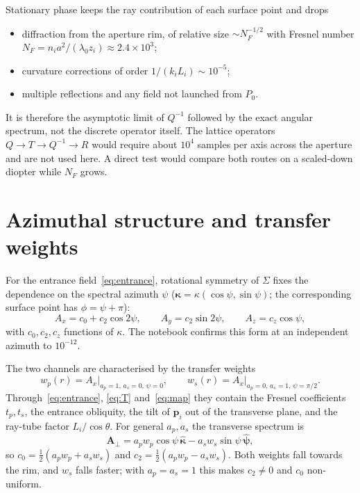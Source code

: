 \documentclass[11pt,a4paper]{article}
\newcommand{\ve}[1]{\bm{#1}}
\begin{document}
Stationary phase keeps the ray contribution of each surface point and drops
\begin{itemize}
 \item diffraction from the aperture rim, of relative size
 $\sim N_F^{-1/2}$ with Fresnel number
 $N_F=n_i a^2/(\lambda_0 z_i)\approx 2.4\times10^3$;
 \item curvature corrections of order $1/(k_iL_i)\sim10^{-5}$;
 \item multiple reflections and any field not launched from $P_0$.
\end{itemize}
It is therefore the asymptotic limit of $Q^{-1}$ followed by the exact angular
spectrum, not the discrete operator itself. The lattice operators
$Q\to T\to Q^{-1}\to R$ would require about $10^4$ samples per axis across the
aperture and are not used here. A direct test would compare both routes on a
scaled-down diopter while $N_F$ grows.

\section{Azimuthal structure and transfer weights}

For the entrance field~\eqref{eq:entrance}, rotational symmetry of $\Sigma$ fixes
the dependence on the spectral azimuth $\psi$
($\boldsymbol\kappa=\kappa(\cos\psi,\sin\psi)$; the corresponding surface point
has $\phi=\psi+\pi$):
\begin{equation}
 A_x=c_0+c_2\cos2\psi,\qquad A_y=c_2\sin2\psi,\qquad A_z=c_z\cos\psi ,
 \label{eq:azimuth}
\end{equation}
with $c_0,c_2,c_z$ functions of $\kappa$. The notebook confirms this form at an
independent azimuth to $10^{-12}$.

The two channels are characterised by the transfer weights
\begin{equation}
 w_p(r)=A_x\big|_{a_p=1,\,a_s=0,\,\psi=0},\qquad
 w_s(r)=A_x\big|_{a_p=0,\,a_s=1,\,\psi=\pi/2}.
\end{equation}
Through~\eqref{eq:entrance}, \eqref{eq:T} and~\eqref{eq:map} they contain the
Fresnel coefficients $t_p,t_s$, the entrance obliquity, the tilt of $\ve p_i$ out
of the transverse plane, and the ray-tube factor $L_i/\cos\theta$. For general
$a_p,a_s$ the transverse spectrum is
\begin{equation}
 \ve A_\perp=a_p w_p\cos\psi\,\hat{\boldsymbol\kappa}-a_s w_s\sin\psi\,\hat{\boldsymbol\psi},
\end{equation}
so $c_0=\tfrac12(a_pw_p+a_sw_s)$ and $c_2=\tfrac12(a_pw_p-a_sw_s)$. Both weights
fall towards the rim, and $w_s$ falls faster; with $a_p=a_s=1$ this makes
$c_2\neq0$ and $c_0$ non-uniform.
\end{document}

